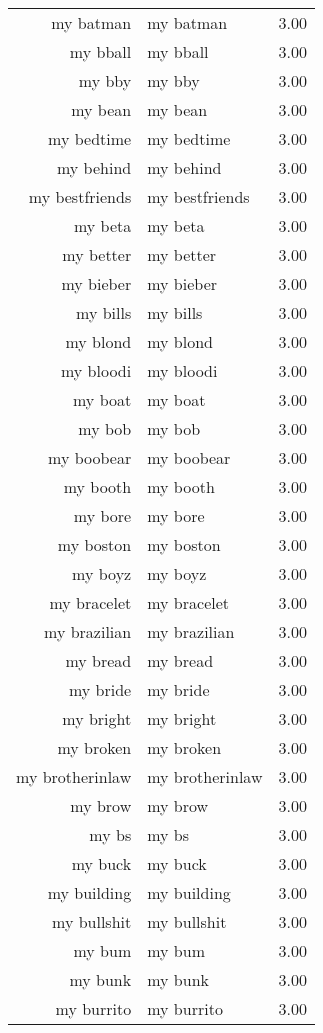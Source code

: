 \begin{table}[ht]
\begin{tabular}{rlr}
  my batman & my batman & 3.00 \\ 
  my bball & my bball & 3.00 \\ 
  my bby & my bby & 3.00 \\ 
  my bean & my bean & 3.00 \\ 
  my bedtime & my bedtime & 3.00 \\ 
  my behind & my behind & 3.00 \\ 
  my bestfriends & my bestfriends & 3.00 \\ 
  my beta & my beta & 3.00 \\ 
  my better & my better & 3.00 \\ 
  my bieber & my bieber & 3.00 \\ 
  my bills & my bills & 3.00 \\ 
  my blond & my blond & 3.00 \\ 
  my bloodi & my bloodi & 3.00 \\ 
  my boat & my boat & 3.00 \\ 
  my bob & my bob & 3.00 \\ 
  my boobear & my boobear & 3.00 \\ 
  my booth & my booth & 3.00 \\ 
  my bore & my bore & 3.00 \\ 
  my boston & my boston & 3.00 \\ 
  my boyz & my boyz & 3.00 \\ 
  my bracelet & my bracelet & 3.00 \\ 
  my brazilian & my brazilian & 3.00 \\ 
  my bread & my bread & 3.00 \\ 
  my bride & my bride & 3.00 \\ 
  my bright & my bright & 3.00 \\ 
  my broken & my broken & 3.00 \\ 
  my brotherinlaw & my brotherinlaw & 3.00 \\ 
  my brow & my brow & 3.00 \\ 
  my bs & my bs & 3.00 \\ 
  my buck & my buck & 3.00 \\ 
  my building & my building & 3.00 \\ 
  my bullshit & my bullshit & 3.00 \\ 
  my bum & my bum & 3.00 \\ 
  my bunk & my bunk & 3.00 \\ 
  my burrito & my burrito & 3.00 \\ 

\end{tabular}
\end{table}
